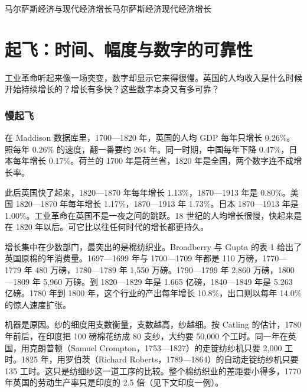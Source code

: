 \begin{compare}{马尔萨斯经济与现代经济增长}{马尔萨斯经济}{现代经济增长}
\end{compare}

\section{起飞：时间、幅度与数字的可靠性}\label{sec:divergence-takeoff}

工业革命听起来像一场突变，数字却显示它来得很慢。英国的人均收入是什么时候开始持续增长的？增长有多快？这些数字本身又有多可靠？

\subsubsection{慢起飞}
在 Maddison 数据库里，1700—1820 年，英国的人均 GDP 每年只增长 0.26\%\cite{mpd2023,broadberry2015}。照每年 0.26\% 的速度，翻一番要约 264 年。同一时期，中国每年下降 0.47\%，日本每年增长 0.17\%。荷兰的 1700 年是荷兰省，1820 年是全国，两个数字连不成增长率。

此后英国快了起来，1820—1870 年每年增长 1.13\%，1870—1913 年是 0.80\%。美国 1820—1870 年每年增长 1.17\%，1870—1913 年 1.73\%。日本 1870—1913 年是 1.00\%\cite{mpd2023}。工业革命在英国不是一夜之间的跳跃。18 世纪的人均增长很慢，快起来是在 1820 年以后。可它比以往任何时代的增长都更持久。

增长集中在少数部门，最突出的是棉纺织业。Broadberry 与 Gupta 的表 1 给出了英国原棉的年消费量。1697—1699 年与 1700—1709 年都是 110 万磅，1770—1779 年 480 万磅，1780—1789 年 1,550 万磅。1790—1799 年 2,860 万磅，1800—1809 年 5,960 万磅。到 1820—1829 年是 1.665 亿磅，1840—1849 年是 5.263 亿磅\cite{bg2005}。1780 年到 1800 年，这个行业的产出每年增长 10.8\%，出口则以每年 14.0\% 的惊人速度扩张\cite{bg2005}。

机器是原因。纱的细度用支数衡量，支数越高，纱越细。按 Catling 的估计，1780 年前后，在印度把 100 磅棉花纺成 80 支纱，大约要 50,000 个工时。同一年在英国，用克朗普顿（Samuel Crompton，1753—1827）的走锭纺纱机只要 2,000 工时。1825 年，用罗伯茨（Richard Roberts，1789—1864）的自动走锭纺纱机只要 135 工时\cite{bg2005}。这只是纺细纱这一道工序的比较。整个棉纺织业的差距要小得多，1770 年英国的劳动生产率只是印度的 2.5 倍（见下文印度一例）。

